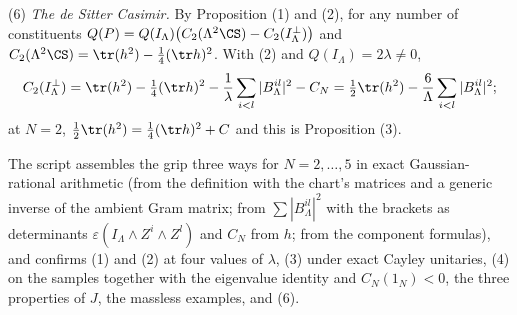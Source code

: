 (6) \emph{The de Sitter Casimir.} By Proposition (1) and (2), for any number of constituents $Q(P) = Q(I_{\Lambda})\bigl(C_{2}(\Lambda^{2}\CS) - C_{2}(I_{\Lambda}^{\perp})\bigr)$ and $C_{2}(\Lambda^{2}\CS) = \tr(h^{2}) - \tfrac14(\tr h)^{2}$. With (2) and $Q(I_{\Lambda}) = 2\lambda \ne 0$,
\[
C_{2}(I_{\Lambda}^{\perp}) = \tr(h^{2}) - \tfrac14(\tr h)^{2} - \frac{1}{\lambda}\sum_{i<l}|B^{il}_{\Lambda}|^{2} - C_{N} = \tfrac12\tr(h^{2}) - \frac{6}{\Lambda}\sum_{i<l}|B^{il}_{\Lambda}|^{2};
\]
at $N = 2$, $\tfrac12\tr(h^{2}) = \tfrac14(\tr h)^{2} + C$ and this is Proposition (3).

The script assembles the grip three ways for $N = 2, \dots, 5$ in exact Gaussian-rational arithmetic (from the definition with the chart's matrices and a generic inverse of the ambient Gram matrix; from $\sum|B^{il}_{\Lambda}|^{2}$ with the brackets as determinants $\varepsilon(I_{\Lambda}\wedge Z^{i}\wedge Z^{l})$ and $C_{N}$ from $h$; from the component formulas), and confirms (1) and (2) at four values of $\lambda$, (3) under exact Cayley unitaries, (4) on the samples together with the eigenvalue identity and $C_{N}(1_{N}) < 0$, the three properties of $J$, the massless examples, and (6).
